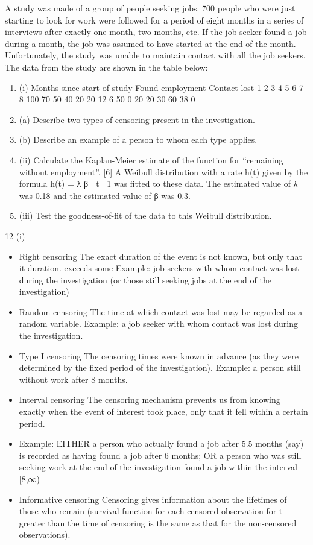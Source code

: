 \documentclass[a4paper,12pt]{article}
\begin{document}
A study was made of a group of people seeking jobs. 700 people who were just starting to look for work were followed for a period of eight months in a series of interviews after exactly one month, two months, etc. If the job seeker found a job during a month, the job was assumed to have started at the end of the month.
Unfortunately, the study was unable to maintain contact with all the job seekers. The data from the study are shown in the table below:
\begin{enumerate}
\item (i)
Months since
start of study Found employment Contact lost
1
2
3
4
5
6
7
8 100
70
50
40
20
20
12
6 50
0
20
20
30
60
38
0
\item (a) Describe two types of censoring present in the investigation.
\item (b) Describe an example of a person to whom each type applies.


\item (ii)
Calculate the Kaplan-Meier estimate of the function for “remaining without
employment”.
[6]
A Weibull distribution with a rate h(t) given by the formula h(t) = λ β  t 1 was fitted
to these data. The estimated value of λ was 0.18 and the estimated value of β was 0.3.
\item (iii)
Test the goodness-of-fit of the data to this Weibull distribution.
\end{enumerate}
\newpage

12
(i)
\begin{itemize}
\item Right censoring
The exact duration of the event is not known, but only that it duration.
exceeds some
Example: job seekers with whom contact was lost during the investigation (or those still seeking jobs at the end of the investigation)
\item Random censoring
The time at which contact was lost may be regarded as a random variable.
Example: a job seeker with whom contact was lost during the investigation.
\item Type I censoring
The censoring times were known in advance (as they were determined by the fixed period of the investigation).
Example: a person still without work after 8 months.
\item Interval censoring
The censoring mechanism prevents us from knowing exactly when the event of interest took place, only that it fell within a certain period.
\item Example: EITHER a person who actually found a job after 5.5 months (say) is recorded as having found a job after 6 months;
OR a person who was still seeking work at the end of the investigation found a job within the interval [8,∞)
\item Informative censoring
Censoring gives information about the lifetimes of those who remain (survival function for each censored observation for t greater than the time of censoring is the same as that for the non-censored observations).
\end{itemize}
\end{document}

